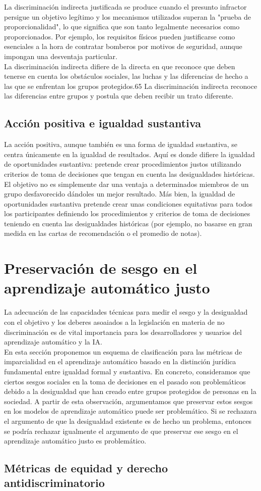 La discriminación indirecta justificada se produce cuando el presunto infractor persigue un objetivo legítimo y los mecanismos utilizados superan la "prueba de proporcionalidad", lo que significa que son tanto legalmente necesarios como proporcionados. Por ejemplo, los requisitos físicos pueden justificarse como esenciales a la hora de contratar bomberos por motivos de seguridad, aunque impongan una desventaja particular.\\

La discriminación indirecta difiere de la directa en que reconoce que deben tenerse en cuenta los obstáculos sociales, las luchas y las diferencias de hecho a las que se enfrentan los grupos protegidos.65 La discriminación indirecta reconoce las diferencias entre grupos y postula que deben recibir un trato diferente.

\subsection{Acción positiva e igualdad sustantiva}
La acción positiva, aunque también es una forma de igualdad sustantiva, se centra únicamente en la igualdad de resultados. Aquí es donde difiere la igualdad de oportunidades sustantiva: pretende crear procedimientos justos utilizando criterios de toma de decisiones que tengan en cuenta las desigualdades históricas. El objetivo no es simplemente dar una ventaja a determinados miembros de un grupo desfavorecido dándoles un mejor resultado. Más bien, la igualdad de oportunidades sustantiva pretende crear unas condiciones equitativas para todos los participantes definiendo los procedimientos y criterios de toma de decisiones teniendo en cuenta las desigualdades históricas (por ejemplo, no basarse en gran medida en las cartas de recomendación o el promedio de notas).


\section{Preservación de sesgo en el aprendizaje automático justo}
La adecuación de las capacidades técnicas para medir el sesgo y la desigualdad con el objetivo y los deberes asoaiados a la legislación en materia de no discriminación es de vital importancia para los desarrolladores y usuarios del aprendizaje automático y la IA.\\

En esta sección proponemos un esquema de clasificación para las métricas de imparcialidad en el aprendizaje automático basado en la distinción jurídica fundamental entre igualdad formal y sustantiva. En concreto, consideramos que ciertos sesgos sociales en la toma de decisiones en el pasado son problemáticos debido a la desigualdad que han creado entre grupos protegidos de personas en la sociedad. A partir de esta observación, argumentamos que preservar estos sesgos en los modelos de aprendizaje automático puede ser problemático. Si se rechazara el argumento de que la desigualdad existente es de hecho un problema, entonces se podría rechazar igualmente el argumento de que preservar ese sesgo en el aprendizaje automático justo es problemático.

\subsection{Métricas de equidad y derecho antidiscriminatorio}
